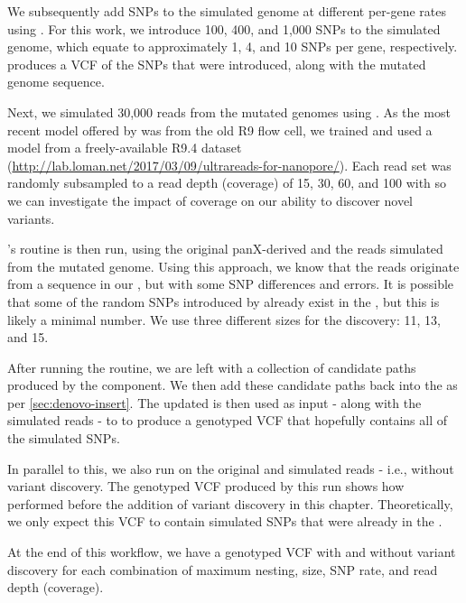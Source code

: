 We subsequently add SNPs to the simulated genome at different per-gene rates using  \cite{snpmutator}. For this work, we introduce 100, 400, and 1,000 SNPs to the simulated genome, which equate to approximately 1, 4, and 10 SNPs per gene, respectively.  produces a VCF of the SNPs that were introduced, along with the mutated genome sequence.

Next, we simulated 30,000 \ont{} reads from the mutated genomes using  \cite{yang2017,brinda2018}. As the most recent model offered by  was from the old R9 \ont{} flow cell, we trained and used a model from a freely-available \ecoli{} R9.4 dataset (\url{http://lab.loman.net/2017/03/09/ultrareads-for-nanopore/}). Each read set was randomly subsampled to a read depth (coverage) of 15, 30, 60, and 100 with  \cite{rasusa2019} so we can investigate the impact of coverage on our ability to discover novel variants.

\pandora{}'s  routine is then run, using the original panX-derived \panrg{} and the reads simulated from the mutated genome. Using this approach, we know that the reads originate from a sequence in our \panrg{}, but with some SNP differences and \ont{} errors. It is possible that some of the random SNPs introduced by  already exist in the \panrg{}, but this is likely a minimal number. We use three different \kmer{} sizes for the \denovo{} discovery: 11, 13, and 15. 

After running the  routine, we are left with a collection of candidate paths produced by the \denovo{} component. We then add these candidate paths back into the \panrg{} as per \autoref{sec:denovo-insert}. The updated \panrg{} is then used as input - along with the simulated reads - to \pandora{}  to produce a genotyped VCF that hopefully contains all of the simulated SNPs.

In parallel to this, we also run \pandora{}  on the original \panrg{} and simulated reads - i.e., without variant discovery. The genotyped VCF produced by this run shows how \pandora{} performed before the addition of \denovo{} variant discovery in this chapter. Theoretically, we only expect this VCF to contain simulated SNPs that were already in the \panrg{}.

At the end of this workflow, we have a genotyped VCF with and without \denovo{} variant discovery for each combination of maximum nesting, \denovo{} \kmer{} size, SNP rate, and read depth (coverage).

